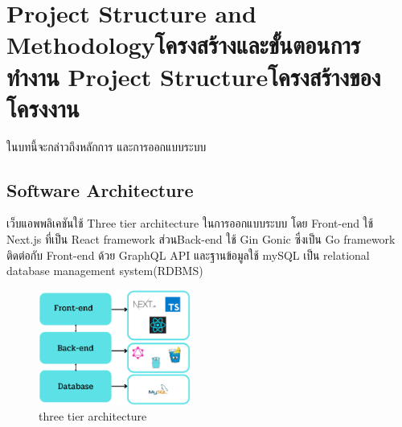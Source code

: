\chapter{\ifproject%
\ifenglish Project Structure and Methodology\else โครงสร้างและขั้นตอนการทำงาน\fi
\else%
\ifenglish Project Structure\else โครงสร้างของโครงงาน\fi
\fi
}

ในบทนี้จะกล่าวถึงหลักการ และการออกแบบระบบ

\makeatletter


\makeatother

\section{Software Architecture}
เว็บแอพพลิเคชันใช้ Three tier architecture ในการออกแบบระบบ โดย Front-end ใช้ Next.js 
ที่เป็น React framework ส่วนBack-end ใช้ Gin Gonic ซึ่งเป็น Go framework ติดต่อกับ Front-end 
ด้วย GraphQL API และฐานข้อมูลใช้ mySQL เป็น relational database management system(RDBMS)
\begin{figure}[h]
\begin{center}
\includegraphics[width=50mm,scale=0.5]{photo/threetierarch.png}
\end{center}
\caption{three tier architecture}
\label{fig:three-tier}
\end{figure}

